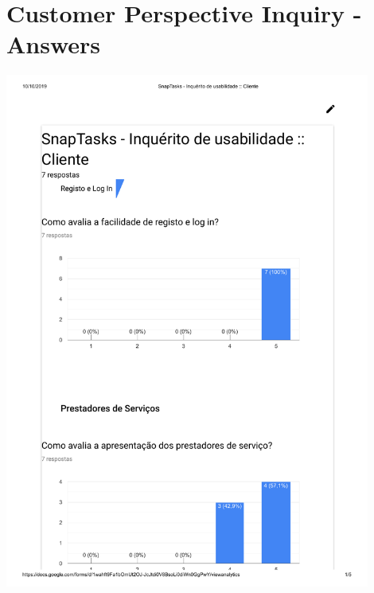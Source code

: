 \chapter{Customer Perspective Inquiry - Answers} %

\label{AppendixF} 

 \includegraphics[page=1,origin=c, width=0.9\textwidth ]{appendices/files/InquiryCustomerAnswers.pdf}

\pagebreak

